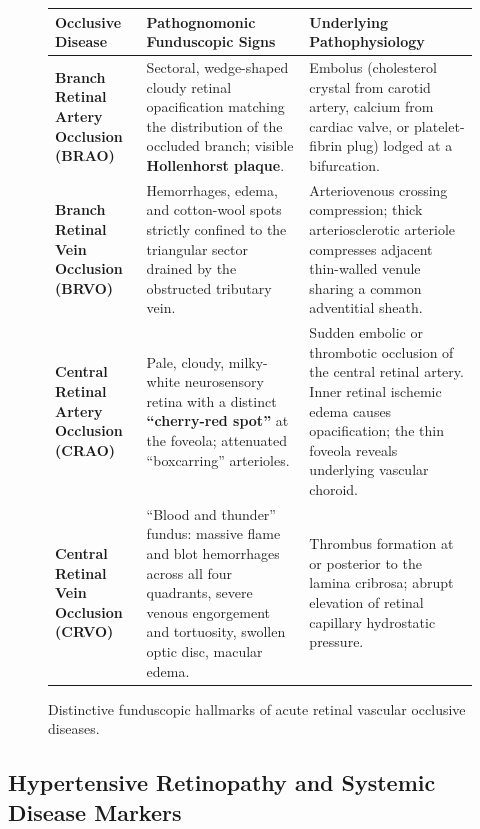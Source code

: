 \documentclass[11pt,a4paper]{article}
\begin{document}
\begin{figure}[htbp]
\centering
\setlength{\tabcolsep}{4pt}
\begin{tabular}{p{3.5cm}p{5.5cm}p{5.5cm}}
\toprule
\textbf{Occlusive Disease} & \textbf{Pathognomonic Funduscopic Signs} & \textbf{Underlying Pathophysiology} \\
\midrule
\textbf{Branch Retinal Artery Occlusion (BRAO)} & Sectoral, wedge-shaped cloudy retinal opacification matching the distribution of the occluded branch; visible \textbf{Hollenhorst plaque}. & Embolus (cholesterol crystal from carotid artery, calcium from cardiac valve, or platelet-fibrin plug) lodged at a bifurcation. \\
\addlinespace
\textbf{Branch Retinal Vein Occlusion (BRVO)} & Hemorrhages, edema, and cotton-wool spots strictly confined to the triangular sector drained by the obstructed tributary vein. & Arteriovenous crossing compression; thick arteriosclerotic arteriole compresses adjacent thin-walled venule sharing a common adventitial sheath. \\
\addlinespace
\textbf{Central Retinal Artery Occlusion (CRAO)} & Pale, cloudy, milky-white neurosensory retina with a distinct \textbf{``cherry-red spot''} at the foveola; attenuated ``boxcarring'' arterioles. & Sudden embolic or thrombotic occlusion of the central retinal artery. Inner retinal ischemic edema causes opacification; the thin foveola reveals underlying vascular choroid. \\
\addlinespace
\textbf{Central Retinal Vein Occlusion (CRVO)} & ``Blood and thunder'' fundus: massive flame and blot hemorrhages across all four quadrants, severe venous engorgement and tortuosity, swollen optic disc, macular edema. & Thrombus formation at or posterior to the lamina cribrosa; abrupt elevation of retinal capillary hydrostatic pressure. \\
\bottomrule
\end{tabular}
\caption{Distinctive funduscopic hallmarks of acute retinal vascular occlusive diseases.}
\label{tab:vascular_occlusions}
\end{figure}

\subsection{Hypertensive Retinopathy and Systemic Disease Markers}
\end{document}
